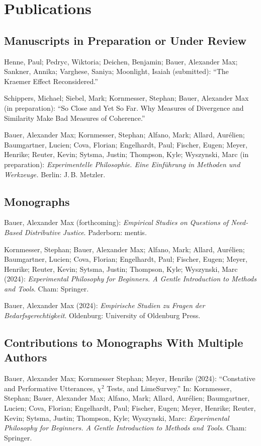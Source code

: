 \documentclass[a4paper,10pt]{article}
\newenvironment{literature}{%
   \parskip6pt\parindent0pt\raggedright
   \def\lititem{\hangindent=1cm\hangafter1}}{%
   \par\ignorespaces}
\begin{document}
\clearpage
\section{Publications}
\subsection*{Manuscripts in Preparation or Under Review}
\begin{literature}
\lititem Henne, Paul; Pedryc, Wiktoria; Deichen, Benjamin; Bauer, Alexander Max; Sankner, Annika; Varghese, Saniya; Moonlight, Isaiah (submitted): \enquote{The Kraemer Effect Reconsidered.}

\lititem Schippers, Michael; Siebel, Mark; Kornmesser, Stephan; Bauer, Alexander Max (in preparation): \enquote{So Close and Yet So Far. Why Measures of Divergence and Similarity Make Bad Measures of Coherence.}

\lititem Bauer, Alexander Max; Kornmesser, Stephan; Alfano, Mark; Allard, Aurélien; Baumgartner, Lucien; Cova, Florian; Engelhardt, Paul; Fischer, Eugen; Meyer, Henrike; Reuter, Kevin; Sytsma, Justin; Thompson, Kyle; Wyszynski, Marc (in preparation): \textit{Experimentelle Philosophie. Eine Einführung in Methoden und Werkzeuge.} Berlin: J.\,B. Metzler.
\end{literature}

\subsection*{Monographs}
\begin{literature}
\lititem Bauer, Alexander Max (forthcoming): \textit{Empirical Studies on Questions of Need-Based Distributive Justice}. Paderborn: mentis.

\lititem Kornmesser, Stephan; Bauer, Alexander Max; Alfano, Mark; Allard, Aurélien; Baumgartner, Lucien; Cova, Florian; Engelhardt, Paul; Fischer, Eugen; Meyer, Henrike; Reuter, Kevin; Sytsma, Justin; Thompson, Kyle; Wyszynski, Marc (2024): \textit{Experimental Philosophy for Beginners. A Gentle Introduction to Methods and Tools}. Cham: Springer.

\lititem Bauer, Alexander Max (2024): \textit{Empirische Studien zu Fragen der Bedarfsgerechtigkeit}. Oldenburg: University of Oldenburg Press.
\end{literature}

\subsection*{Contributions to Monographs With Multiple Authors}
\begin{literature}
\lititem Bauer, Alexander Max; Kornmesser Stephan; Meyer, Henrike (2024): \enquote{Constative and Performative Utterances, $\chi^2$ Tests, and LimeSurvey.} In: Kornmesser, Stephan; Bauer, Alexander Max; Alfano, Mark; Allard, Aurélien; Baumgartner, Lucien; Cova, Florian; Engelhardt, Paul; Fischer, Eugen; Meyer, Henrike; Reuter, Kevin; Sytsma, Justin; Thompson, Kyle; Wyszynski, Marc: \textit{Experimental Philosophy for Beginners. A Gentle Introduction to Methods and Tools}. Cham: Springer.
\end{literature}
\end{document}
